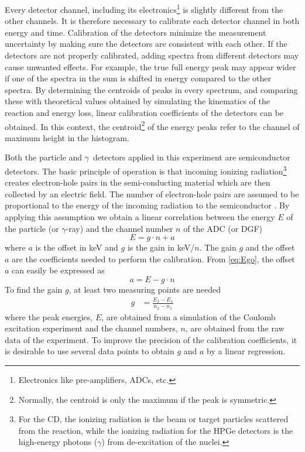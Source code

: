 \documentclass[twoside,english]{uiofysmaster/uiofysmaster}
\newcommand{\ga}{$\gamma$}
\let\orgautoref\autoref
\renewcommand{\autoref}
        {%
		 \def\sectionautorefname{Section}%
		 \def\subsectionautorefname{Section}%
		 \def\subsubsectionautorefname{Section}%
		 \def\chapterautorefname{Chapter}%
          \orgautoref}
\begin{document}
Every detector channel, including its electronics\footnote{Electronics like pre-amplifiers, ADCs, etc.} is slightly different from the other channels. 
It is therefore necessary to calibrate each detector channel in both energy and time.
Calibration of the detectors minimize the measurement uncertainty by making sure the detectors are consistent with each other.
If the detectors are not properly calibrated, adding spectra from different detectors may cause unwanted effects. 
For example, the true full energy peak may appear wider if one of the spectra in the sum is shifted in energy compared to the other spectra.
By determining the centroids of peaks in every spectrum, and comparing these with theoretical values obtained by simulating the kinematics of the reaction and energy loss, linear calibration coefficients of the detectors can be obtained. 
In this context, the centroid\footnote{Normally, the centroid is only the maximum if the peak is symmetric.} of the energy peaks refer to the channel of maximum height in the histogram.

Both the particle and \ga\ detectors applied in this experiment are semiconductor detectors. 
The basic principle of operation is that incoming ionizing radiation\footnote{For the CD, the ionizing radiation is the beam or target particles scattered from the reaction, while the ionizing radiation for the HPGe detectors is the high-energy photons (\ga) from de-excitation of the nuclei.} creates electron-hole pairs in the semi-conducting material which are then collected by an electric field. 
The number of electron-hole pairs are assumed to be proportional to the energy of the incoming radiation to the semiconductor \cite{WRLeo}. 
By applying this assumption we obtain a linear correlation between the energy $E$ of the particle (or \ga-ray) and the channel number $n$ of the ADC (or DGF)
\begin{equation}\label{eq:Ego}
	E = g \cdot n + a
\end{equation}
where $a$ is the offset in keV and $g$ is the gain in keV/$n$. 
The gain $g$ and the offset $a$ are the coefficients needed to perform the calibration.
From \autoref{eq:Ego}, the offset $a$ can easily be expressed as 
\begin{equation}\label{eq:offset}
	a = E - g \cdot n 
\end{equation}
To find the gain $g$, at least two measuring points are needed
\begin{align}\label{eq:gain}
	g &= \frac{E_2 - E_1}{n_2 - n_1}
\end{align}
where the peak energies, $E$, are obtained from a simulation of the Coulomb excitation experiment and the channel numbers, $n$, are obtained from the raw data of the experiment.
To improve the precision of the calibration coefficients, it is desirable to use several data points to obtain $g$ and $a$ by a linear regression.
\end{document}
